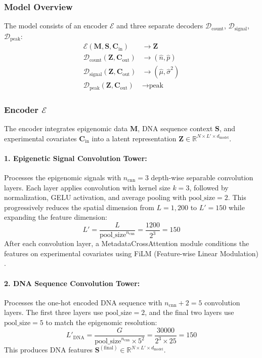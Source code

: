 \subsubsection{Model Overview}

The model consists of an encoder $\mathcal{E}$ and three separate decoders $\mathcal{D}_{\text{count}}$, $\mathcal{D}_{\text{signal}}$, $\mathcal{D}_{\text{peak}}$:
\begin{align}
    \mathcal{E}(\mathbf{M}, \mathbf{S}, \mathbf{C}_{\text{in}}) &\rightarrow \mathbf{Z} \\
    \mathcal{D}_{\text{count}}(\mathbf{Z}, \mathbf{C}_{\text{out}}) &\rightarrow (\hat{n}, \hat{p}) \\
    \mathcal{D}_{\text{signal}}(\mathbf{Z}, \mathbf{C}_{\text{out}}) &\rightarrow (\hat{\mu}, \hat{\sigma}^2) \\
    \mathcal{D}_{\text{peak}}(\mathbf{Z}, \mathbf{C}_{\text{out}}) &\rightarrow \text{peak}
\end{align}

\subsubsection{Encoder $\mathcal{E}$}

The encoder integrates epigenomic data $\mathbf{M}$, DNA sequence context $\mathbf{S}$, and experimental covariates $\mathbf{C}_{\text{in}}$ into a latent representation $\mathbf{Z} \in \mathbb{R}^{N \times L' \times d_{\text{model}}}$.

\paragraph{1. Epigenetic Signal Convolution Tower:} 
Processes the epigenomic signals with $n_{\text{cnn}} = 3$ depth-wise separable convolution layers. Each layer applies convolution with kernel size $k = 3$, followed by normalization, GELU activation, and average pooling with $\text{pool\_size} = 2$. This progressively reduces the spatial dimension from $L = 1{,}200$ to $L' = 150$ while expanding the feature dimension:
\begin{equation}
    L' = \frac{L}{\text{pool\_size}^{n_{\text{cnn}}}} = \frac{1200}{2^3} = 150
\end{equation}
After each convolution layer, a MetadataCrossAttention module conditions the features on experimental covariates using FiLM (Feature-wise Linear Modulation) \cite{perez2018film}.

\paragraph{2. DNA Sequence Convolution Tower:} 
Processes the one-hot encoded DNA sequence with $n_{\text{cnn}} + 2 = 5$ convolution layers. The first three layers use $\text{pool\_size} = 2$, and the final two layers use $\text{pool\_size} = 5$ to match the epigenomic resolution:
\begin{equation}
    L'_{\text{DNA}} = \frac{G}{\text{pool\_size}^{n_{\text{cnn}}} \times 5^2} = \frac{30000}{2^3 \times 25} = 150
\end{equation}
This produces DNA features $\mathbf{S}^{(\text{final})} \in \mathbb{R}^{N \times L' \times d_{\text{model}}}$.

